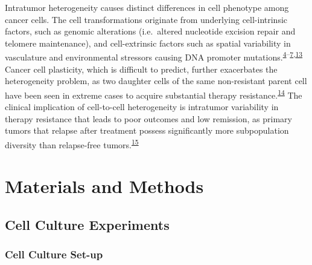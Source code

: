 \documentclass[11pt]{article}
\begin{document}
Intratumor heterogeneity causes distinct differences in cell phenotype
among cancer cells. The cell transformations originate from underlying
cell-intrinsic factors, such as genomic alterations (i.e.~altered
nucleotide excision repair and telomere maintenance), and cell-extrinsic
factors such as spatial variability in vasculature and environmental
stressors causing DNA promoter
mutations.\textsuperscript{\protect\hyperlink{ref-BreastMicroEnv}{4}--\protect\hyperlink{ref-HistoneInhibi}{7},\protect\hyperlink{ref-TNBpatterns}{13}}
Cancer cell plasticity, which is difficult to predict, further
exacerbates the heterogeneity problem, as two daughter cells of the same
non-resistant parent cell have been seen in extreme cases to acquire
substantial therapy
resistance.\textsuperscript{\protect\hyperlink{ref-Stochasticstatetransitions}{14}}
The clinical implication of cell-to-cell heterogeneity is intratumor
variability in therapy resistance that leads to poor outcomes and low
remission, as primary tumors that relapse after treatment possess
significantly more subpopulation diversity than relapse-free
tumors.\textsuperscript{\protect\hyperlink{ref-Cancerstemcells}{15}}

\hypertarget{materials-and-methods}{%
\section{Materials and Methods}\label{materials-and-methods}}

\hypertarget{cell-culture-experiments}{%
\subsection{Cell Culture Experiments}\label{cell-culture-experiments}}

\hypertarget{cell-culture-set-up}{%
\subsubsection{Cell Culture Set-up}\label{cell-culture-set-up}}
\end{document}
